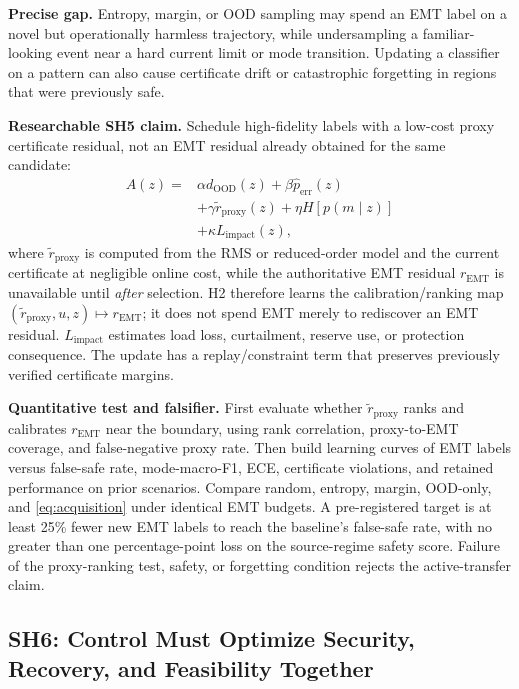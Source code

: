 \documentclass[conference]{IEEEtran}
\begin{document}
\textbf{Precise gap.} Entropy, margin, or OOD sampling may spend an EMT label on a novel but operationally harmless trajectory, while undersampling a familiar-looking event near a hard current limit or mode transition. Updating a classifier on a pattern can also cause certificate drift or catastrophic forgetting in regions that were previously safe.

\textbf{Researchable SH5 claim.} Schedule high-fidelity labels with a low-cost proxy certificate residual, not an EMT residual already obtained for the same candidate:
\begin{equation}
\begin{aligned}
 A(z)={}&\alpha d_{\mathrm{OOD}}(z)+\beta\widehat p_{\mathrm{err}}(z)\\
&+\gamma \widetilde r_{\mathrm{proxy}}(z)+\eta H[p(m\mid z)]\\
&+\kappa L_{\mathrm{impact}}(z),
\end{aligned}
\label{eq:acquisition}
\end{equation}
where $\widetilde r_{\mathrm{proxy}}$ is computed from the RMS or reduced-order model and the current certificate at negligible online cost, while the authoritative EMT residual $r_{\mathrm{EMT}}$ is unavailable until \emph{after} selection. H2 therefore learns the calibration/ranking map $(\widetilde r_{\mathrm{proxy}},u,z)\mapsto r_{\mathrm{EMT}}$; it does not spend EMT merely to rediscover an EMT residual. $L_{\mathrm{impact}}$ estimates load loss, curtailment, reserve use, or protection consequence. The update has a replay/constraint term that preserves previously verified certificate margins.

\textbf{Quantitative test and falsifier.} First evaluate whether $\widetilde r_{\mathrm{proxy}}$ ranks and calibrates $r_{\mathrm{EMT}}$ near the boundary, using rank correlation, proxy-to-EMT coverage, and false-negative proxy rate. Then build learning curves of EMT labels versus false-safe rate, mode-macro-F1, ECE, certificate violations, and retained performance on prior scenarios. Compare random, entropy, margin, OOD-only, and \eqref{eq:acquisition} under identical EMT budgets. A pre-registered target is at least 25\% fewer new EMT labels to reach the baseline's false-safe rate, with no greater than one percentage-point loss on the source-regime safety score. Failure of the proxy-ranking test, safety, or forgetting condition rejects the active-transfer claim.

\subsection{SH6: Control Must Optimize Security, Recovery, and Feasibility Together}
\end{document}
